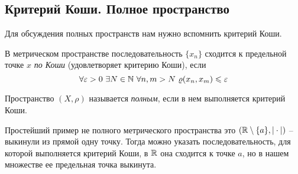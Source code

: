 \documentclass[../functional-analysis_17-18.tex]{subfiles}
\begin{document}
    \subsection{Критерий Коши. Полное пространство}
    
    Для обсуждения полных пространств нам нужно вспомнить критерий Коши.
    
    \begin{definition}
        В метрическом пространстве последовательность $\{x_n\}$ сходится к  предельной точке $x$ \textit{по Коши} (удовлетворяет критерию Коши), если   
        \begin{equation}
            \forall \epsilon > 0 \ \exists N \in \N \ \forall n, m > N \ \rho(x_n, x_m) \leq \epsilon
        \end{equation}
        
    \end{definition}
    
    \begin{definition}
        Пространство $(X, \rho)$ называется \textit{полным}, если в нем выполняется критерий Коши.
    \end{definition}
	
    Простейший пример не полного метрического пространства это $(\mathbb{R} \setminus \{a\}, |\cdot|)$ -- выкинули из прямой одну точку. Тогда можно указать последовательность, для которой выполняется критерий Коши, в $\mathbb{R}$ она сходится к точке $a$,  но в нашем множестве ее предельная точка выкинута.                                                 
    
\end{document}
